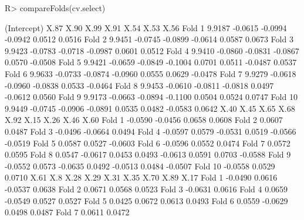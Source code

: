 \documentclass[
]{jss}
\begin{document}
\begin{CodeChunk}
\begin{CodeInput}
R> compareFolds(cv.select)
\end{CodeInput}
\begin{CodeOutput}
        (Intercept)    X.87    X.90    X.99    X.91    X.54    X.53    X.56
Fold 1       9.9187 -0.0615 -0.0994 -0.0942  0.0512  0.0516                
Fold 2       9.9451 -0.0745 -0.0899 -0.0614          0.0587          0.0673
Fold 3       9.9423 -0.0783 -0.0718 -0.0987  0.0601                  0.0512
Fold 4       9.9410 -0.0860 -0.0831 -0.0867  0.0570         -0.0508        
Fold 5       9.9421 -0.0659 -0.0849 -0.1004  0.0701  0.0511 -0.0487  0.0537
Fold 6       9.9633 -0.0733 -0.0874 -0.0960  0.0555  0.0629 -0.0478        
Fold 7       9.9279 -0.0618 -0.0960 -0.0838  0.0533         -0.0464        
Fold 8       9.9453 -0.0610 -0.0811 -0.0818          0.0497 -0.0612  0.0560
Fold 9       9.9173 -0.0663 -0.0894 -0.1100  0.0504  0.0524          0.0747
Fold 10      9.9449 -0.0745 -0.0906 -0.0891  0.0535  0.0482 -0.0583  0.0642
           X.40    X.45    X.65    X.68    X.92    X.15    X.26    X.46    X.60
Fold 1                  -0.0590                 -0.0456  0.0658  0.0608        
Fold 2                                   0.0607          0.0487                
Fold 3  -0.0496         -0.0664          0.0494                                
Fold 4  -0.0597  0.0579 -0.0531          0.0519 -0.0566                 -0.0519
Fold 5                           0.0587                          0.0527 -0.0603
Fold 6  -0.0596  0.0552          0.0474                                        
Fold 7           0.0572          0.0595                                        
Fold 8           0.0547 -0.0617  0.0453  0.0493 -0.0613  0.0591  0.0703 -0.0588
Fold 9  -0.0552  0.0573 -0.0635  0.0492         -0.0513  0.0484         -0.0507
Fold 10 -0.0558                          0.0529                  0.0710        
           X.61     X.8    X.28    X.29    X.31    X.35    X.70    X.89    X.17
Fold 1  -0.0490          0.0616 -0.0537                  0.0638                
Fold 2           0.0671                  0.0568                  0.0523        
Fold 3  -0.0631          0.0616                                                
Fold 4           0.0659         -0.0549          0.0527                  0.0527
Fold 5           0.0425                  0.0672  0.0613          0.0493        
Fold 6           0.0559         -0.0629  0.0498          0.0487                
Fold 7                                                           0.0611  0.0472

\end{CodeOutput}
\end{CodeChunk}
\end{document}
